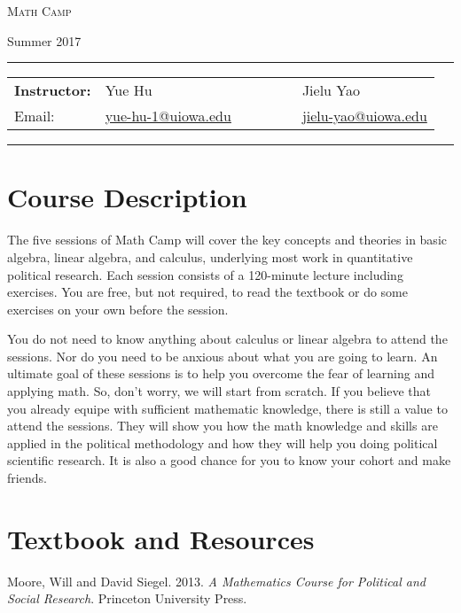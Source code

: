 \documentclass[11pt, a4paper]{article}
\begin{document}
\begin{center}
{\Large \textsc{Math Camp}}
\end{center}
\begin{center}
Summer 2017
\end{center}

\begin{center}
\rule{6in}{0.4pt}
\begin{minipage}[t]{.75\textwidth}
\begin{tabular}{llcccll}
\textbf{Instructor:} & Yue Hu & & &  &  & Jielu Yao  \\
Email: &  \href{mailto:yue-hu-1@uiowa.edu}{yue-hu-1@uiowa.edu} & & & &  & \href{mailto:jielu-yao@uiowa.edu}{jielu-yao@uiowa.edu} 
\end{tabular}
\end{minipage}
\rule{6in}{0.4pt}
\end{center}
\vspace{.5cm}
\setlength{\unitlength}{1in}
\renewcommand{\arraystretch}{2}

\section{Course Description}
The five sessions of Math Camp will cover the key concepts and theories in basic algebra, linear algebra, and calculus, underlying most work in quantitative political research. 
Each session consists of a 120-minute lecture including exercises. 
You are free, but not required, to read the textbook or do some exercises on your own before the session.

You do not need to know anything about calculus or linear algebra to attend the sessions. 
Nor do you need to be anxious about what you are going to learn. 
An ultimate goal of these sessions is to help you overcome the fear of learning and applying math. 
So, don't worry, we will start from scratch.
If you believe that you already equipe with sufficient mathematic knowledge, there is still a value to attend the sessions. 
They will show you how the math knowledge and skills are applied in the political methodology and how they will help you doing political scientific research.
It is also a good chance for you to know your cohort and make friends.

\section{Textbook and Resources}
Moore, Will and David Siegel. 2013. {\it A Mathematics Course for Political and Social Research}. Princeton University Press.
\end{document}
